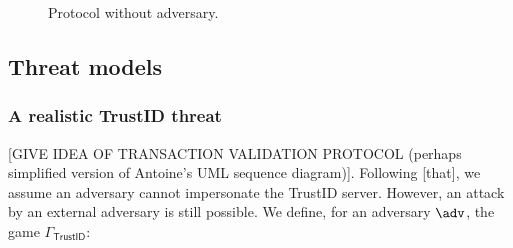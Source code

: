 \documentclass{article}
\begin{document}
\begin{figure}
    \centering
    \caption{Protocol without adversary.}
    \label{fig:no_adv}
\end{figure}

\subsection{Threat models}
\subsubsection{A realistic TrustID threat}
[GIVE IDEA OF TRANSACTION VALIDATION PROTOCOL (perhaps simplified version of Antoine's UML sequence diagram)]. Following [that], we assume an adversary cannot impersonate the TrustID server. However, an attack by an external adversary is still possible. We define, for an adversary $\adv$, the game $\Gamma_{\mathsf{TrustID}}$:
\end{document}
